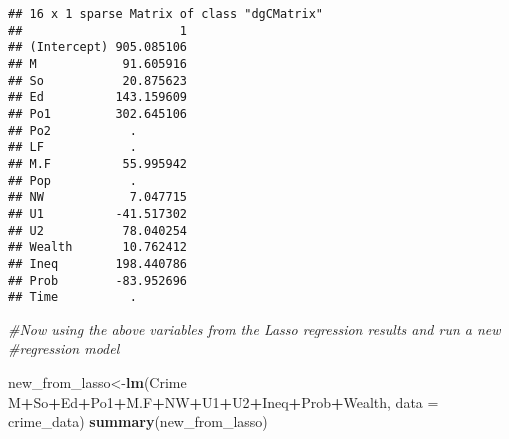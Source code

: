 \documentclass[
]{article}
\newenvironment{Shaded}{\begin{snugshade}}{\end{snugshade}}
\newcommand{\CommentTok}[1]{\textcolor[rgb]{0.56,0.35,0.01}{\textit{#1}}}
\newcommand{\DataTypeTok}[1]{\textcolor[rgb]{0.13,0.29,0.53}{#1}}
\newcommand{\KeywordTok}[1]{\textcolor[rgb]{0.13,0.29,0.53}{\textbf{#1}}}
\newcommand{\NormalTok}[1]{#1}
\newcommand{\OperatorTok}[1]{\textcolor[rgb]{0.81,0.36,0.00}{\textbf{#1}}}
\newcommand{\StringTok}[1]{\textcolor[rgb]{0.31,0.60,0.02}{#1}}
\begin{document}
\begin{Shaded}
\end{Shaded}

\begin{verbatim}
## 16 x 1 sparse Matrix of class "dgCMatrix"
##                      1
## (Intercept) 905.085106
## M            91.605916
## So           20.875623
## Ed          143.159609
## Po1         302.645106
## Po2           .       
## LF            .       
## M.F          55.995942
## Pop           .       
## NW            7.047715
## U1          -41.517302
## U2           78.040254
## Wealth       10.762412
## Ineq        198.440786
## Prob        -83.952696
## Time          .
\end{verbatim}

\begin{Shaded}
\begin{Highlighting}[]
\CommentTok{#Now using the above variables from the Lasso regression results and run a new }
\CommentTok{#regression model}

\NormalTok{new_from_lasso<-}\KeywordTok{lm}\NormalTok{(Crime }\OperatorTok{~}\StringTok{ }\NormalTok{M}\OperatorTok{+}\NormalTok{So}\OperatorTok{+}\NormalTok{Ed}\OperatorTok{+}\NormalTok{Po1}\OperatorTok{+}\NormalTok{M.F}\OperatorTok{+}\NormalTok{NW}\OperatorTok{+}\NormalTok{U1}\OperatorTok{+}\NormalTok{U2}\OperatorTok{+}\NormalTok{Ineq}\OperatorTok{+}\NormalTok{Prob}\OperatorTok{+}\NormalTok{Wealth, }
                   \DataTypeTok{data =}\NormalTok{ crime_data)}
\KeywordTok{summary}\NormalTok{(new_from_lasso)}
\end{Highlighting}
\end{Shaded}
\end{document}
